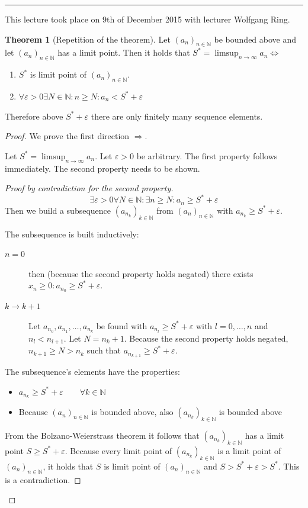 \documentclass[a4paper,landscape,twocolumn]{article}
\theoremstyle{definition}
\newtheorem{theorem}{Theorem}
\newcommand\seq[1]{{\left(#1\right)}_{n \in \mathbb N}}
\newcommand\meta[3]{\hrule{} This #1 took place on #2 with lecturer #3.\par}
\begin{document}
\meta{lecture}{9th of December 2015}{Wolfgang Ring}
\begin{theorem}[Repetition of the theorem]
  Let $\seq{a_n}$ be bounded above and let $\seq{a_n}$ has a limit point.
  Then it holds that $S^* = \limsup_{n\to\infty} a_n \Leftrightarrow$
  \begin{enumerate}
    \item $S^*$ is limit point of $\seq{a_n}$.
    \item $\forall \varepsilon > 0 \exists N \in \mathbb N: n \geq N: a_n < S^* + \varepsilon$
  \end{enumerate}
  Therefore above $S^* + \varepsilon$ there are only finitely many sequence elements.
\end{theorem}
\begin{proof}
  We prove the first direction $\Rightarrow$.

  Let $S^* = \limsup_{n\to\infty} a_n$. Let $\varepsilon > 0$ be arbitrary.
  The first property follows immediately.
  The second property needs to be shown.

  \begin{proof}[Proof by contradiction for the second property]
    \[ \exists \varepsilon > 0 \forall N \in \mathbb N: \exists n \geq N: a_n \geq S^* + \varepsilon \]
    Then we build a subsequence $\left(a_{n_k}\right)_{k\in\mathbb N}$ from $\seq{a_n}$ with $a_{n_k} \geq S^* + \varepsilon$.

    The subsequence is built inductively:
    \begin{description}
      \item[$n = 0$]
        then (because the second property holds negated) there exists $x_n \geq 0: a_{n_0} \geq S^* + \varepsilon$.
      \item[$k \to k+1$]
        Let $a_{n_0}, a_{n_1}, \dots, a_{n_k}$ be found with $a_{n_l} \geq S^* + \varepsilon$ with $l = 0, \dots, n$
        and $n_l < n_{l+1}$. Let $N = n_k + 1$. Because the second property holds negated, $n_{k+1} \geq N > n_k$
        such that $a_{n_{k+1}} \geq S^* + \varepsilon$.
    \end{description}

    The subsequence's elements have the properties:
    \begin{itemize}
      \item $a_{n_k} \geq S^* + \varepsilon \qquad \forall k \in \mathbb N$
      \item Because $\seq{a_n}$ is bounded above, also $\left(a_{n_k}\right)_{k\in\mathbb N}$ is bounded above
    \end{itemize}
    From the Bolzano-Weierstrass theorem it follows that $\left(a_{n_k}\right)_{k\in\mathbb N}$ has a limit point
    $S \geq S^* + \varepsilon$. Because every limit point of $\left(a_{n_k}\right)_{k\in\mathbb N}$ is a limit point
    of $\seq{a_n}$, it holds that $S$ is limit point of $\seq{a_n}$ and $S > S^* + \varepsilon > S^*$.
    This is a contradiction.
  \end{proof}


\end{proof}
\end{document}
